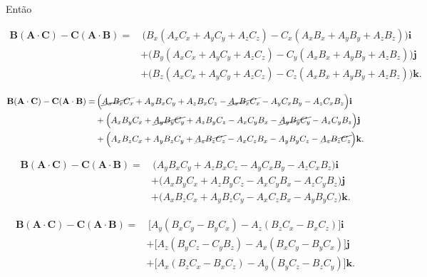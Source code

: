 \documentclass[a4paper,12pt]{article}
\begin{document}
Ent\~ao


\begin{equation}
    \begin{aligned}
\mathbf{B} (\mathbf{A} \cdot \mathbf{C}) - \mathbf{C} (\mathbf{A} \cdot \mathbf{B}) = & \, \Big( B_x (A_x C_x + A_y C_y + A_z C_z) - C_x (A_x B_x + A_y B_y + A_z B_z) \Big) \mathbf{i} \\
& + \Big( B_y (A_x C_x + A_y C_y + A_z C_z) - C_y (A_x B_x + A_y B_y + A_z B_z) \Big) \mathbf{j} \\
& + \Big( B_z (A_x C_x + A_y C_y + A_z C_z) - C_z (A_x B_x + A_y B_y + A_z B_z) \Big) \mathbf{k}.
    \end{aligned}
\end{equation}

\begin{equation}
    \begin{aligned}
\mathbf{B} (\mathbf{A} \cdot \mathbf{C}) - \mathbf{C} (\mathbf{A} \cdot \mathbf{B}) = & \, \Big( \cancel{A_x B_x C_x} + A_y B_x C_y + A_z B_x C_z -  \cancel{A_x B_x C_x}  - A_y C_x B_y - A_z C_xB_z \Big) \mathbf{i} \\
& + \Big(  A_x B_y C_x + \cancel{A_y B_y C_y} + A_z B_y C_z  - A_x C_y B_x - \cancel{A_y B_y C_y} - A_z C_y B_z \Big) \mathbf{j} \\
& + \Big(  A_x B_z C_x + A_y B_z C_y + \cancel{A_z B_z C_z} - A_x C_z B_x - A_y B_y C_z - \cancel{A_z B_z C_z} \Big) \mathbf{k}.
    \end{aligned}
\end{equation}

\begin{equation}
    \begin{aligned}
\mathbf{B} (\mathbf{A} \cdot \mathbf{C}) - \mathbf{C} (\mathbf{A} \cdot \mathbf{B}) = & \, \Big(A_y B_x C_y + A_z B_x C_z - A_y C_x B_y - A_z C_xB_z \Big) \mathbf{i} \\
& + \Big(  A_x B_y C_x + A_z B_y C_z  - A_x C_y B_x - A_z C_y B_z \Big) \mathbf{j} \\
& + \Big(  A_x B_z C_x + A_y B_z C_y - A_x C_z B_x - A_y B_y C_z \Big) \mathbf{k}.
    \end{aligned}
\end{equation}

\begin{equation}
\boxed{
    \begin{aligned}
\mathbf{B} (\mathbf{A} \cdot \mathbf{C}) - \mathbf{C} (\mathbf{A} \cdot \mathbf{B}) = & \, \Big[A_y (B_x C_y -B_y C_x ) - A_z (B_z C_x - B_x C_z) \Big] \mathbf{i} \\
& + \Big[ A_z (B_y C_z - C_y B_z) - A_x (B_x C_y  - B_y C_x)     \Big] \mathbf{j} \\
& + \Big[  A_x(B_z C_x - B_x C_z)  - A_y (B_y C_z - B_z C_y)   \Big] \mathbf{k}.
    \end{aligned}
}
\end{equation}
\end{document}
